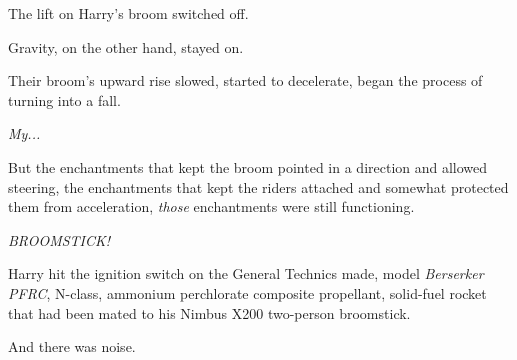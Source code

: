The lift on Harry's broom switched off.

Gravity, on the other hand, stayed on.

Their broom's upward rise slowed, started to decelerate, began the
process of turning into a fall.

\emph{My...}

But the enchantments that kept the broom pointed in a direction and
allowed steering, the enchantments that kept the riders attached and
somewhat protected them from acceleration, \emph{those} enchantments
were still functioning.

\emph{BROOMSTICK!}

Harry hit the ignition switch on the General Technics made, model
\emph{Berserker PFRC}, N-class, ammonium perchlorate composite
propellant, solid-fuel rocket that had been mated to his Nimbus X200
two-person broomstick.

And there was noise.
